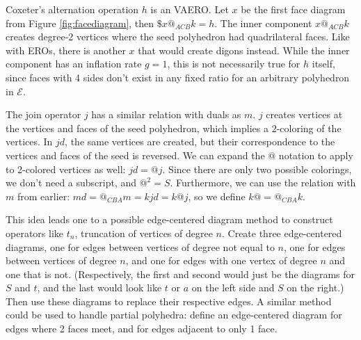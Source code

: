 \documentclass[12pt]{amsart}%
\begin{document}
Coxeter's alternation operation $h$ is an VAERO. Let $x$ be the first face
diagram from Figure \ref{fig:facediagram}, then $\$x@_{ACB}k = h$. The inner
component $x@_{ACB}k$ creates degree-2 vertices where the seed polyhedron had
quadrilateral faces. Like with EROs, there is another $x$ that would create
digons instead. While the inner component has an inflation rate $g=1$,
this is not necessarily true for $h$ itself, since faces with 4 sides don't
exist in any fixed ratio for an arbitrary polyhedron in $\mathcal{E}$.

The join operator $j$ has a similar relation with duals as $m$. $j$ creates
vertices at the vertices and faces of the seed polyhedron, which implies a
2-coloring of the vertices. In $jd$, the same vertices are created, but their
correspondence to the vertices and faces of the seed is reversed. We can expand
the $@$ notation to apply to 2-colored vertices as well: $jd = @j$. Since there
are only two possible colorings, we don't need a subscript, and $@^2 = S$.
Furthermore, we can use the relation with $m$ from earlier: $md = @_{CBA}m =
kjd = k@j$, so we define $k@ = @_{CBA}k$.

This idea leads one to a possible edge-centered diagram method to construct
operators like $t_n$, truncation of vertices of degree $n$. Create three
edge-centered diagrams, one for edges between vertices of degree not equal to
$n$, one for edges between vertices of degree $n$, and one for edges with one
vertex of degree $n$ and one that is not. (Respectively, the first and second
would just be the diagrams for $S$ and $t$, and the last would look like $t$ or
$a$ on the left side and $S$ on the right.) Then use these diagrams to replace
their respective edges. A similar method could be used to handle partial
polyhedra: define an edge-centered diagram for edges where 2 faces meet, and
for edges adjacent to only 1 face.
\end{document}

